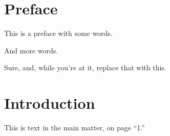 \documentclass{stml-l}
\begin{document}
\frontmatter
\chapter*{Preface}
This is a preface with some %
words. 

\newpage

And %
more words.

\newpage

Sure, and, while you're at it, replace that with this.

\mainmatter

\chapter{Introduction}
This %
is text in %
the main matter, on page ``1.''
\end{document}
